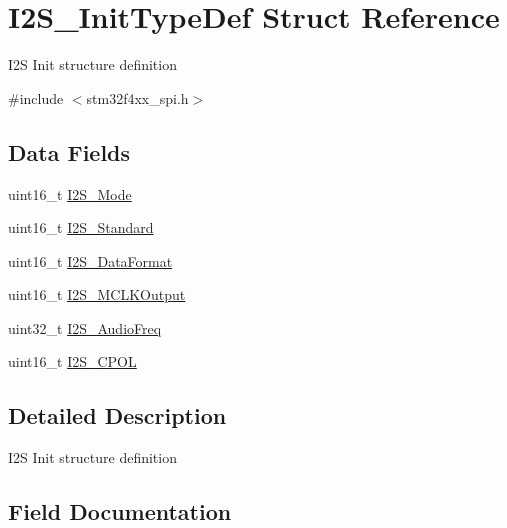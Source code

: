\hypertarget{struct_i2_s___init_type_def}{}\section{I2\+S\+\_\+\+Init\+Type\+Def Struct Reference}
\label{struct_i2_s___init_type_def}


I2S Init structure definition ~\newline
  




{\ttfamily \#include $<$stm32f4xx\+\_\+spi.\+h$>$}

\subsection*{Data Fields}
\begin{DoxyCompactItemize}
\item 
uint16\+\_\+t \mbox{\hyperlink{struct_i2_s___init_type_def_ab239a97360862b2514410fef774686f5}{I2\+S\+\_\+\+Mode}}
\item 
uint16\+\_\+t \mbox{\hyperlink{struct_i2_s___init_type_def_a0f0c02142c68e2c2f0038ca79bdbd365}{I2\+S\+\_\+\+Standard}}
\item 
uint16\+\_\+t \mbox{\hyperlink{struct_i2_s___init_type_def_a5d36bbd1f2aa29414ae1d25c3cc0d66c}{I2\+S\+\_\+\+Data\+Format}}
\item 
uint16\+\_\+t \mbox{\hyperlink{struct_i2_s___init_type_def_a4e49b94b867428b8abf8e5385fb0879d}{I2\+S\+\_\+\+M\+C\+L\+K\+Output}}
\item 
uint32\+\_\+t \mbox{\hyperlink{struct_i2_s___init_type_def_aabe09351d033858f65fb27add7c50918}{I2\+S\+\_\+\+Audio\+Freq}}
\item 
uint16\+\_\+t \mbox{\hyperlink{struct_i2_s___init_type_def_a948d79d6388454da8459fea27c338900}{I2\+S\+\_\+\+C\+P\+OL}}
\end{DoxyCompactItemize}


\subsection{Detailed Description}
I2S Init structure definition ~\newline
 

\subsection{Field Documentation}
\mbox{\label{struct_i2_s___init_type_def_aabe09351d033858f65fb27add7c50918}} 
